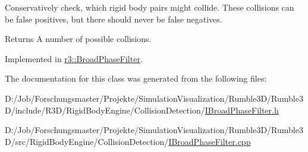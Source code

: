 Conservatively check, which rigid body pairs might collide. These collisions can be false positives, but there should never be false negatives. \begin{DoxyReturn}{Returns}
A number of possible collisions. 
\end{DoxyReturn}


Implemented in \mbox{\hyperlink{classr3_1_1_broad_phase_filter_a0435dc6468401e32bf151f84f52e80f8}{r3\+::\+Broad\+Phase\+Filter}}.



The documentation for this class was generated from the following files\+:\begin{DoxyCompactItemize}
\item 
D\+:/\+Job/\+Forschungsmaster/\+Projekte/\+Simulation\+Visualization/\+Rumble3\+D/\+Rumble3\+D/include/\+R3\+D/\+Rigid\+Body\+Engine/\+Collision\+Detection/\mbox{\hyperlink{_i_broad_phase_filter_8h}{I\+Broad\+Phase\+Filter.\+h}}\item 
D\+:/\+Job/\+Forschungsmaster/\+Projekte/\+Simulation\+Visualization/\+Rumble3\+D/\+Rumble3\+D/src/\+Rigid\+Body\+Engine/\+Collision\+Detection/\mbox{\hyperlink{_i_broad_phase_filter_8cpp}{I\+Broad\+Phase\+Filter.\+cpp}}\end{DoxyCompactItemize}
